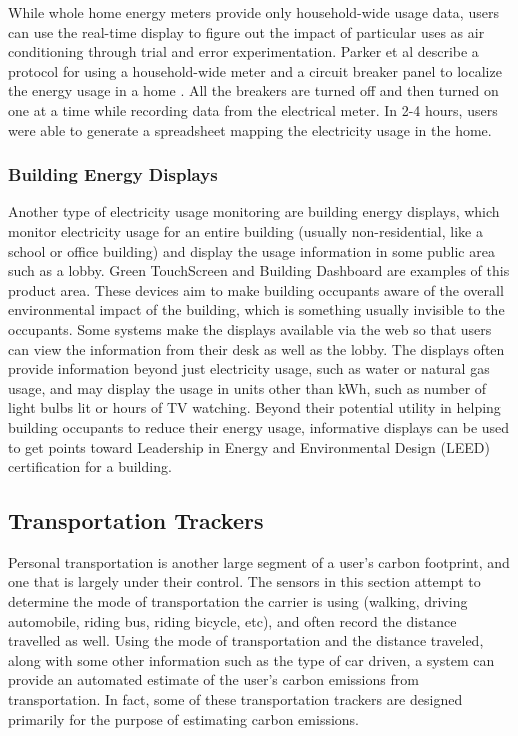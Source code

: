 While whole home energy meters provide only household-wide usage data, users can use the real-time display to figure out the impact of particular uses as air conditioning through trial and error experimentation. Parker et al describe a protocol for using a household-wide meter and a circuit breaker panel to localize the energy usage in a home \cite{Parker2006How-Much-Energy}. All the breakers are turned off and then turned on one at a time while recording data from the electrical meter. In 2-4 hours, users were able to generate a spreadsheet mapping the electricity usage in the home.

\subsubsection{Building Energy Displays}

Another type of electricity usage monitoring are building energy displays, which monitor electricity usage for an entire building (usually non-residential, like a school or office building) and display the usage information in some public area such as a lobby. Green TouchScreen \cite{greentouchscreen} and Building Dashboard \cite{building-dashboard} are examples of this product area. These devices aim to make building occupants aware of the overall environmental impact of the building, which is something usually invisible to the occupants. Some systems make the displays available via the web so that users can view the information from their desk as well as the lobby. The displays often provide  information beyond just electricity usage, such as water or natural gas usage, and may display the usage in units other than kWh, such as number of light bulbs lit or hours of TV watching. Beyond their potential utility in helping building occupants to reduce their energy usage, informative displays can be used to get points toward Leadership in Energy and Environmental Design (LEED) certification for a building.

\subsection{Transportation Trackers}

Personal transportation is another large segment of a user's carbon footprint, and one that is largely under their control. The sensors in this section attempt to determine the mode of transportation the carrier is using (walking, driving automobile, riding bus, riding bicycle, etc), and often record the distance travelled as well. Using the mode of transportation and the distance traveled, along with some other information such as the type of car driven, a system can provide an automated estimate of the user's carbon emissions from transportation. In fact, some of these transportation trackers are designed primarily for the purpose of estimating carbon emissions.

